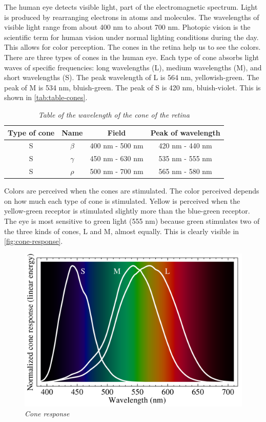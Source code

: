\documentclass[paper=a4, fontsize=10pt]{scrartcl}	%
\begin{document}
	The human eye detects visible light, part of the electromagnetic spectrum. Light is produced by rearranging electrons in atoms and molecules. The wavelengths of visible light range from about 400 nm to about 700 nm. Photopic vision is the scientific term for human vision under normal lighting conditions during the day. This allows for color perception. The cones in the retina help us to see the colors. There are three types of cones in the human eye. Each type of cone absorbs light waves of specific frequencies: long wavelengths (L), medium wavelengths (M), and short wavelengths (S). The peak wavelength of L is 564 nm, yellowish-green. The peak of M is 534 nm, bluish-green. The peak of S is 420 nm, bluish-violet. This is shown in \autoref{tab:table-cones}.

	\begin{table}[H]
		\centering
		\begin{center}
			\begin{tabular}{ |c|c|c|c| } 
				\hline
				\textbf{Type of cone} & \textbf{Name} & \textbf{Field} & \textbf{Peak of wavelength} \\ 
				\hline
				S & \(\beta\) & 400 nm - 500 nm & 420 nm - 440 nm \\
				\hline
				S & \(\gamma\) & 450 nm - 630 nm & 535 nm - 555 nm \\
				\hline
				S & \(\rho\) & 500 nm - 700 nm & 565 nm - 580 nm \\
				\hline
			\end{tabular}
		\end{center}
		\caption{\textit{Table of the wavelength of the cone of the retina}}
		\label{tab:table-cones}
	\end{table}
	
	Colors are perceived when the cones are stimulated. The color perceived depends on how much each type of cone is stimulated. Yellow is perceived when the yellow-green receptor is stimulated slightly more than the blue-green receptor. The eye is most sensitive to green light (555 nm) because green stimulates two of the three kinds of cones, L and M, almost equally. This is clearly visible in \autoref{fig:cone-response}.

	\begin{figure}[H]
		\centering
		\includegraphics[width=0.75\linewidth]{images/eye/2880px-Cone-fundamentals-with-srgb-spectrum.svg.png}
		\caption{\textit{Cone response}}
		\label{fig:cone-response}
	\end{figure}
\end{document}
